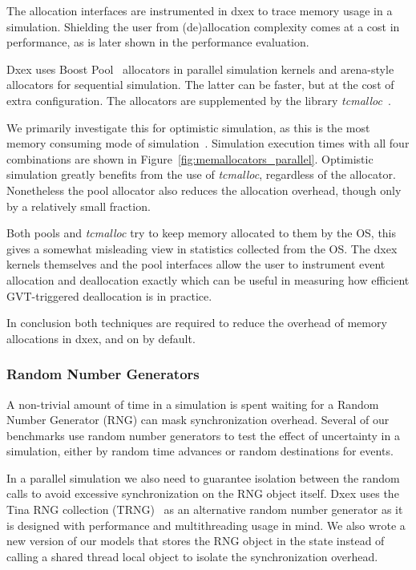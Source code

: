 The allocation interfaces are instrumented in dxex to trace memory usage in a simulation.
Shielding the user from (de)allocation complexity comes at a cost in performance, as is later shown in the performance evaluation.

Dxex uses Boost Pool~\cite{boostpool} allocators in parallel simulation kernels and arena-style allocators for sequential simulation.
The latter can be faster, but at the cost of extra configuration.
The allocators are supplemented by the library \textit{tcmalloc}~\cite{tcmalloc}.

We primarily investigate this for optimistic simulation, as this is the most memory consuming mode of simulation~\cite{Fujimoto}.
Simulation execution times with all four combinations are shown in Figure~\ref{fig:memallocators_parallel}.
Optimistic simulation greatly benefits from the use of \textit{tcmalloc}, regardless of the allocator.
Nonetheless the pool allocator also reduces the allocation overhead, though only by a relatively small fraction.

Both pools and \textit{tcmalloc} try to keep memory allocated to them by the OS, this gives a somewhat misleading view in statistics collected from the OS.
The dxex kernels themselves and the pool interfaces allow the user to instrument event allocation and deallocation exactly which can be useful in measuring how efficient GVT-triggered deallocation is in practice.

In conclusion both techniques are required to reduce the overhead of memory allocations in dxex, and on by default.

\subsubsection{Random Number Generators}
A non-trivial amount of time in a simulation is spent waiting for a Random Number Generator (RNG) can mask synchronization overhead.
Several of our benchmarks use random number generators to test the effect of uncertainty in a simulation, either by random time advances or random destinations for events.

In a parallel simulation we also need to guarantee isolation between the random calls to avoid excessive synchronization on the RNG object itself.
Dxex uses the Tina RNG collection (TRNG)~\cite{PhysRevE.75.066701} as an alternative random number generator as it is designed with performance and multithreading usage in mind.
We also wrote a new version of our models that stores the RNG object in the state instead of calling a shared thread local object to isolate the synchronization overhead.

